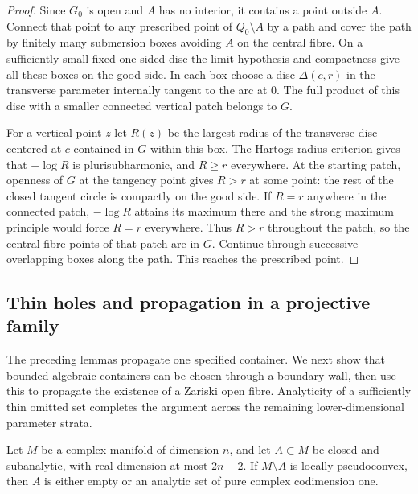 \begin{proof}
Since $G_0$ is open and $A$ has no interior, it contains a point
outside $A$. Connect that point to any prescribed point of
$Q_0\setminus A$ by a path and cover the path by finitely many
submersion boxes avoiding $A$ on the central fibre. On a sufficiently
small fixed one-sided disc the limit hypothesis and compactness
give all these boxes on the good side. In each box choose a disc
$\Delta(c,r)$ in the transverse parameter internally tangent to
the arc at $0$. The full product of this disc with a smaller
connected vertical patch belongs to $G$.

For a vertical point $z$ let $R(z)$ be the largest radius of the
transverse disc centered at $c$ contained in $G$ within this box.
The Hartogs radius criterion gives that $-\log R$ is
plurisubharmonic, and $R\geq r$ everywhere. At the starting patch,
openness of $G$ at the tangency point gives $R>r$ at some point:
the rest of the closed tangent circle is compactly on the good
side. If $R=r$ anywhere in the connected patch, $-\log R$
attains its maximum there and the strong maximum principle
would force $R=r$ everywhere. Thus $R>r$ throughout the patch,
so the central-fibre points of that patch are in $G$. Continue
through successive overlapping boxes along the path. This reaches
the prescribed point.
\end{proof}

\subsection{Thin holes and propagation in a projective family}

The preceding lemmas propagate one specified container. We next show
that bounded algebraic containers can be chosen through a boundary
wall, then use this to propagate the existence of a Zariski open
fibre. Analyticity of a sufficiently thin omitted set completes the
argument across the remaining lower-dimensional parameter strata.

\begin{theorem}
\label{holes:thin-analyticity}
Let $M$ be a complex manifold of dimension $n$, and let $A\subset M$
be closed and subanalytic, with real dimension at most $2n-2$.
If $M\setminus A$ is locally pseudoconvex, then $A$ is either
empty or an analytic set of pure complex codimension one.
\end{theorem}

